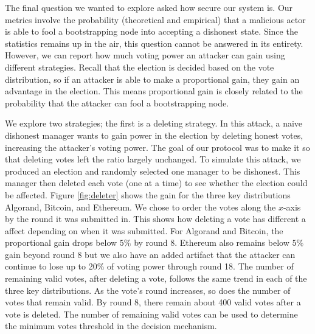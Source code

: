 The final question we wanted to explore asked how secure our system is.
Our metrics involve the probability (theoretical and empirical) that a malicious actor is able to fool a bootstrapping node into accepting a dishonest state.
Since the statistics remains up in the air, this question cannot be answered in its entirety.
However, we can report how much voting power an attacker can gain using different strategies.
Recall that the election is decided based on the vote distribution, so if an attacker is able to make a proportional gain, they gain an advantage in the election.
This means proportional gain is closely related to the probability that the attacker can fool a bootstrapping node.

We explore two strategies; the first is a deleting strategy.
In this attack, a naive dishonest manager wants to gain power in the election by deleting honest votes, increasing the attacker's voting power.
The goal of our protocol was to make it so that deleting votes left the ratio largely unchanged.
To simulate this attack, we produced an election and randomly selected one manager to be dishonest.
This manager then deleted each vote (one at a time) to see whether the election could be affected.
Figure \ref{fig:deleter} shows the gain for the three key distributions Algorand, Bitcoin, and Ethereum. 
We chose to order the votes along the $x$-axis by the round it was submitted in.
This shows how deleting a vote has different a affect depending on when it was submitted.
For Algorand and Bitcoin, the proportional gain drops below $5\%$ by round 8.
Ethereum also remains below $5\%$ gain beyond round 8 but we also have an added artifact that the attacker can continue to lose  up to 20\% of voting power through round 18.
The number of remaining valid votes, after deleting a vote, follows the same trend in each of the three key distributions.
As the vote's round increases, so does the number of votes that remain valid.
By round 8, there remain about 400 valid votes after a vote is deleted.
The number of remaining valid votes can be used to determine the minimum votes threshold in the decision mechanism.

